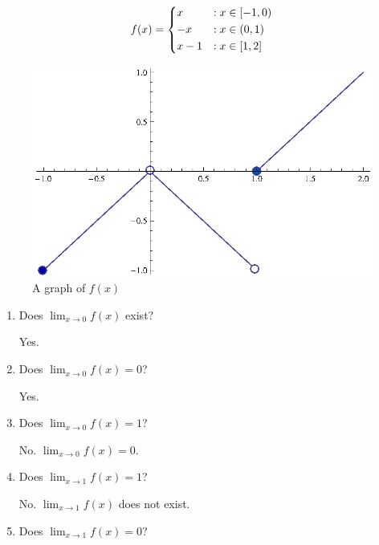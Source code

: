 \begin{ex}
  \[ f(x)=
    \begin{dcases}
      x &: x \in \left[ -1,0 \right) \\
      -x &: x \in \left (0,1 \right) \\
      x-1 &: x \in \left[1, 2\right]
    \end{dcases}
    \]
  \begin{figure}[h]
    \begin{center}
      \includegraphics{graphs/pwlimex1}
    \end{center}
    \caption{A graph of \(f(x)\)}
    \label{fig:pwlimex1}
  \end{figure}
  \begin{enumerate}
    \item Does \( \lim_{x\to 0} f(x) \) exist?

      \begin{sol}
        Yes.
      \end{sol}
    \item Does \( \lim_{x \to 0} f(x)=0 \)?

      \begin{sol}
        Yes.
      \end{sol}
    \item Does \(\lim_{x \to 0} f(x)=1\)?

      \begin{sol}
        No. \(\lim_{x \to 0} f(x)=0\).
      \end{sol}
    \item Does \(\lim_{x \to 1} f(x)=1\)?

      \begin{sol}
        No. \( \lim_{x \to 1} f(x) \) does not exist.
      \end{sol}
    \item Does \(\lim_{x \to 1} f(x)=0\)?


\end{enumerate}
\end{ex}
